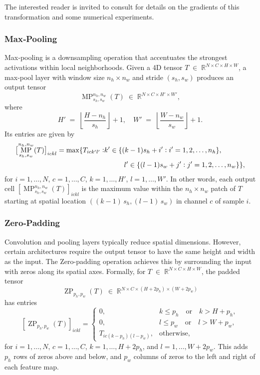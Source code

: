 \documentclass[10pt,a4paper,oneside]{article}
\DeclareMathOperator{\maxpool}{MP}
\DeclareMathOperator{\zeropad}{ZP}
\begin{document}
The interested reader is invited to consult \cite{ioffe2015} for details on the gradients of this transformation and some numerical experiments. 

\subsubsection{Max‐Pooling}

Max‐pooling is a downsampling operation that accentuates the strongest activations within local neighborhoods.  Given a 4D tensor $T \;\in\; \mathbb{R}^{N \times C \times H \times W}$, a max‐pool layer with window size \(n_h \times n_w\) and stride \((s_h,s_w)\) produces an output tensor 
\[
\maxpool^{n_h,n_w}_{s_h,s_w}(T)
\;\in\;
\mathbb{R}^{N \times C \times H' \times W'},
\]
where
\[
H' \;=\;\left\lfloor\frac{H - n_h}{s_h}\right\rfloor + 1,
\quad
W' \;=\;\left\lfloor\frac{W - n_w}{s_w}\right\rfloor + 1.
\]
Its entries are given by
\begin{align*}
    \bigl[\maxpool^{n_h, n_w}_{s_h, s_w}(T)\bigr]_{ickl} = \max \{ T_{ick'l'} :  &k' \in \{ (k - 1) s_h + i' : i' = 1, 2, \dots, n_h \},\\
    &\hspace{10mm} l' \in \{ (l - 1) s_w + j' : j' = 1, 2, \dots, n_w \}\},
\end{align*}
for $i=1,\dots,N$,\; $c=1,\dots,C$,\; $k=1,\dots,H'$,\;
$l=1,\dots,W'$. In other words, each output cell $\left[\maxpool^{n_h, n_w}_{s_h, s_w}(T)\right]_{ickl}$ is the maximum value within the \(n_h\times n_w\) patch of \(T\) starting at spatial location \(((k - 1)\,s_h, (l - 1) \,s_w)\) in channel \(c\) of sample \(i\).


\subsubsection{Zero‐Padding}

Convolution and pooling layers typically reduce spatial dimensions.  However, certain architectures require the output tensor to have the same height and width as the input.  The Zero-padding operation achieves this by surrounding the input with zeros along its spatial axes.  Formally, for $T \;\in\; \mathbb{R}^{N \times C \times H \times W}$, the padded tensor
\[
\zeropad_{p_h,p_w}(T)
\;\in\;
\mathbb{R}^{N \times C \times (H + 2p_h) \times (W + 2p_w)}
\]
has entries
\[
\left[\zeropad_{p_h,p_w}(T)\right]_{ickl}
=
\begin{cases}
0, & k \le p_h \quad\text{or}\quad k > H + p_h,\\[4pt]
0, & l \le p_w \quad\text{or}\quad l > W + p_w,\\[4pt]
T_{ic(k - p_h)(l - p_w)}, & \text{otherwise},
\end{cases}
\]
for \(i=1,\dots,N\), \(c=1,\dots,C\), \(k=1,\dots,H+2p_h\), and \(l=1,\dots,W+2p_w\).  This adds \(p_h\) rows of zeros above and below, and \(p_w\) columns of zeros to the left and right of each feature map.
\end{document}
